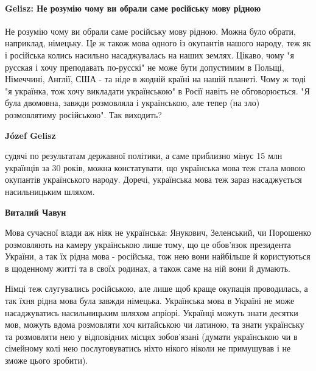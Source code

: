  
 
 
 
 
\paragraph{Gelisz: Не розумію чому ви обрали саме російську мову рідною}

\begin{itemize}


Не розумію чому ви обрали саме російську мову рідною. Можна було обрати,
наприклад, німецьку. Це ж також мова одного із окупантів нашого народу, теж як
і російська колись насильно насаджувалась на наших землях. Цікаво, чому "я
русская і хочу преподавать по-русскі" не може бути допустимим в Польщі,
Німеччині, Англії, США - та ніде в жодній країні на нашій планеті. Чому ж тоді
"я українка, тож хочу викладати українською" в Росії навіть не обговорюється.
"Я була двомовна, завжди розмовляла і українською, але тепер (на зло)
розмовлятиму російською". Так виходить?

\begin{itemize}


\textbf{Józef Gelisz} 

судячі по результатам державної політики, а саме приблизно мінус 15 млн
українців за 30 років, можна констатувати, що українська мова теж стала мовою
окупантів українського народу. Доречі, українська мова теж зараз насаджується
насильницьким шляхом.

\textbf{Виталий Чавун} 

Мова сучасної влади аж ніяк не українська: Янукович, Зеленський, чи Порошенко
розмовляють на камеру українською лише тому, що це обов'язок президента
України, а так їх рідна мова - російська, тож нею вони найбільше й користуються
в щоденному житті та в своїх родинах, а також саме на ній вони й думають. 

Німці теж слугувались російською, але лише щоб краще окупація проводилась, а
так їхня рідна мова була завжди німецька. Українська мова в Україні не може
насаджуватись насильницьким шляхом апріорі. Українці можуть знати десятки мов,
можуть вдома розмовляти хоч китайською чи латиною, та знати українську та
розмовляти нею у відповідних місцях зобов'язані (думати українською чи в
сімейному колі нею послуговуватись ніхто нікого ніколи не примушував і не зможе
цього зробити). 


\end{itemize}
\end{itemize}
